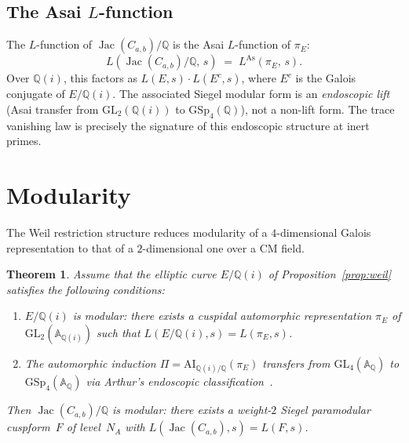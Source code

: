 \documentclass[11pt,a4paper]{article}
\newcommand{\Jac}{\operatorname{Jac}}
\newcommand{\GSp}{\mathrm{GSp}}
\newcommand{\GL}{\mathrm{GL}}
\newtheorem{theorem}{Theorem}[section]
\theoremstyle{definition}
\theoremstyle{remark}
\begin{document}
\subsection{The Asai $L$-function}

The $L$-function of $\Jac(C_{a,b})/\mathbb{Q}$ is the
Asai $L$-function of $\pi_E$:
\begin{equation}\label{eq:asai}
  L(\Jac(C_{a,b})/\mathbb{Q},\, s)
  \;=\; L^{\mathrm{As}}(\pi_E,\, s).
\end{equation}
Over $\mathbb{Q}(i)$, this factors as
$L(E, s) \cdot L(E^c, s)$, where $E^c$ is the
Galois conjugate of $E/\mathbb{Q}(i)$.
The associated Siegel modular form is an
\emph{endoscopic lift} (Asai transfer from
$\GL_2(\mathbb{Q}(i))$ to $\GSp_4(\mathbb{Q})$),
not a non-lift form.
The trace vanishing law is precisely the signature of this
endoscopic structure at inert primes.


\section{Modularity}\label{sec:modularity}

The Weil restriction structure reduces modularity of a
$4$-dimensional Galois representation to that of a
$2$-dimensional one over a CM field.

\begin{theorem}\label{thm:modularity}
  Assume that the elliptic curve $E/\mathbb{Q}(i)$ of
  Proposition~\ref{prop:weil} satisfies the following conditions:
  \begin{enumerate}[label=$(\mathrm{M}\arabic*)$]
    \item\label{M1}
    $E/\mathbb{Q}(i)$ is modular: there exists a cuspidal
    automorphic representation $\pi_E$ of
    $\GL_2(\mathbb{A}_{\mathbb{Q}(i)})$ such that
    $L(E/\mathbb{Q}(i), s) = L(\pi_E, s)$.
    \item\label{M2}
    The automorphic induction
    $\Pi = \mathrm{AI}_{\mathbb{Q}(i)/\mathbb{Q}}(\pi_E)$
    transfers from $\GL_4(\mathbb{A}_{\mathbb{Q}})$ to
    $\GSp_4(\mathbb{A}_{\mathbb{Q}})$ via Arthur's endoscopic
    classification~\cite{Arthur}.
  \end{enumerate}
  Then $\Jac(C_{a,b})/\mathbb{Q}$ is modular: there exists a
  weight-$2$ Siegel paramodular cuspform~$F$ of level~$N_A$ with
  $L(\Jac(C_{a,b}), s) = L(F, s)$.
\end{theorem}
\end{document}
